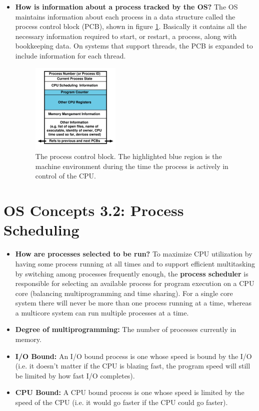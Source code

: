 \documentclass[12pt]{article}
\begin{document}
\begin{itemize}
    \item \textbf{How is information about a process tracked by the OS?} The OS maintains information about each process in a data structure called the process control block (PCB), shown in figure \ref{fig:process-control-block}. Basically it contains all the necessary information required to start, or restart, a process, along with bookkeeping data. On systems that support threads, the PCB is expanded to include information for each thread.
    \begin{figure}[ht]
        \centering
        \includegraphics[width=0.4\textwidth]{figures/process-control-block.jpg}
        \caption{The process control block. The highlighted blue region is the machine environment during the time the process is actively in control of the CPU.}
        \label{fig:process-control-block}
    \end{figure}
\end{itemize}

\section*{OS Concepts 3.2: Process Scheduling}

\begin{itemize}
    \item \textbf{How are processes selected to be run?} To maximize CPU utilization by having some process running at all times and to support efficient multitasking by switching among processes frequently enough, the \textbf{process scheduler} is responsible for selecting an available process for program execution on a CPU core (balancing multiprogramming and time sharing). For a single core system there will never be more than one process running at a time, whereas a multicore system can run multiple processes at a time.
    \item \textbf{Degree of multiprogramming:} The number of processes currently in memory.
    \item \textbf{I/O Bound:} An I/O bound process is one whose speed is bound by the I/O (i.e. it doesn't matter if the CPU is blazing fast, the program speed will still be limited by how fast I/O completes).
    \item \textbf{CPU Bound:} A CPU bound process is one whose speed is limited by the speed of the CPU (i.e. it would go faster if the CPU could go faster).
\end{itemize}
\end{document}
